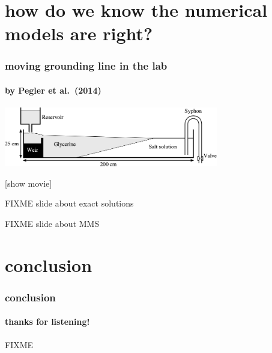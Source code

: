 \documentclass[hide notes,intlimits]{beamer}
\begin{document}
\section[on being right]{how do we know the numerical models are right?}

\begin{frame}
  \frametitle{moving grounding line in the lab}
  \framesubtitle{by Pegler et al.~(2014)}

\begin{center}

\includegraphics[width=0.7\textwidth]{pegler2014-grounding-line-schematic}

\vspace{1.0in}
[show movie]
\end{center}
\end{frame}


\begin{frame}{FIXME slide about exact solutions}
\end{frame}


\begin{frame}{FIXME slide about MMS}
\end{frame}





\section*{conclusion}

\begin{frame}
  \frametitle{conclusion}
  \framesubtitle{thanks for listening!}

\begin{center}
FIXME
\end{center}

\end{frame}
\end{document}

